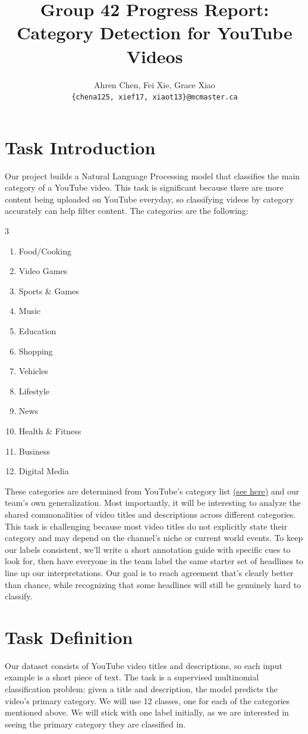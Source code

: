 \documentclass[11pt]{article}
\title{Group 42 Progress Report:\\ Category Detection for YouTube Videos}
\author{
  Ahren Chen, Fei Xie, Grace Xiao\\
  \texttt{\{chena125, xief17, xiaot13\}@mcmaster.ca}
}
\begin{document}
\maketitle

\section{Task Introduction}

Our project builds a Natural Language Processing model that classifies the main category of a YouTube video. This task is significant because there are more content being uploaded on YouTube everyday,
so classifying videos by category accurately can help filter content. The categories are the following: 
\begin{multicols}{3}
  \begin{enumerate}
    \item Food/Cooking
    \item Video Games
    \item Sports \& Games
    \item Music
    \item Education
    \item Shopping
    \item Vehicles
    \item Lifestyle
    \item News
    \item Health \& Fitness
    \item Business
    \item Digital Media
  \end{enumerate}
\end{multicols}
These categories are determined from YouTube’s category list \href{https://mixedanalytics.com/blog/list-of-youtube-video-category-ids/}{(see here)} 
and our team’s own generalization. Most importantly, it will be interesting 
to analyze the shared commonalities of video titles and descriptions across 
different categories. This task is challenging because most video titles do 
not explicitly state their category and may depend on the channel’s niche 
or current world events. To keep our labels consistent, we’ll write a short
annotation guide with specific cues to look for, then
have everyone in the team label the same starter
set of headlines to line up our interpretations. Our
goal is to reach agreement that’s clearly better than
chance, while recognizing that some headlines will
still be genuinely hard to classify.

\section{Task Definition}
Our dataset consists of YouTube video titles and descriptions, so each input example is a short piece of text. 
The task is a supervised multinomial classification problem: given a title and description, the model predicts the video's primary category. We will use 12 classes, one for each of the categories mentioned above.
We will stick with one label initially, as we are interested in seeing the primary category they are classified in.
\end{document}
